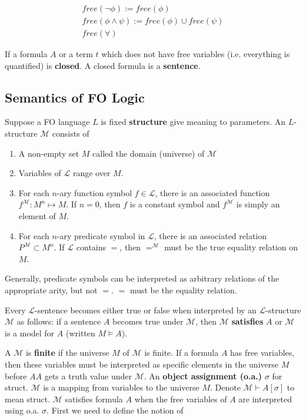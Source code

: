 \documentclass[twoside]{article}
\def\L{\mathcal{L}}
\def\M{\mathcal{M}}
\begin{document}
\begin{align*}
free(\lnot \phi) := free(\phi) \\
free(\phi \land \psi) := free(\phi) \cup free(\psi) \\
free(\forall )
\end{align*}

If a formula $A$ or a term $t$ which does not have free variables (i.e. everything is quantified) is \textbf{closed}. A closed formula is a \textbf{sentence}. 

\subsection{Semantics of FO Logic}
Suppose a FO language $L$ is fixed \textbf{structure} give meaning to parameters. An $L$-structure $\M$ consists of 
\begin{enumerate}
\item A non-empty set $M$ called the domain (universe) of $\mathcal{M}$
\item Variables of $\L$ range over $M$.
\item For each $n$-ary function symbol $f \in \L$, there is an associated function $f^{\M}: M^n \mapsto M$. If $n = 0$, then $f$ is a constant symbol and $f^{\M}$ is simply an element of $M$.
\item For each $n$-ary predicate symbol in $\L$, there is an associated relation $P^{\M} \subset M^n$. If $\L$ contains $=$, then $=^{\M}$ must be the true equality relation on $M$.
\end{enumerate}
Generally, predicate symbols can be interpreted as arbitrary relations of the appropriate arity, but not $=$. $=$ must be the equality relation.

Every $\L$-sentence becomes either true or false when interpreted by an $\L$-structure $\M$ as follows: if a sentence $A$ becomes true under $\M$, then $\M$ \textbf{satisfies} $A$ or $\M$ is a model for $A$ (written $M \vDash A$). 

A $\M$ is \textbf{finite} if the universe $M$ of $\M$ is finite. If a formula $A$ has free variables, then these variables must be interpreted as specific elements in the universe $M$ before $AA$ gets a truth value under $\M$. An \textbf{object assignment (o.a.)} $\sigma$ for struct. $\M$ is a mapping from variables to the universe $M$. Denote $\M \vdash A[\sigma]$ to mean struct. $\M$ satisfies formula $A$ when the free variables of $A$ are interpreted using o.a. $\sigma$. First we need to define the notion of  
\end{document}
